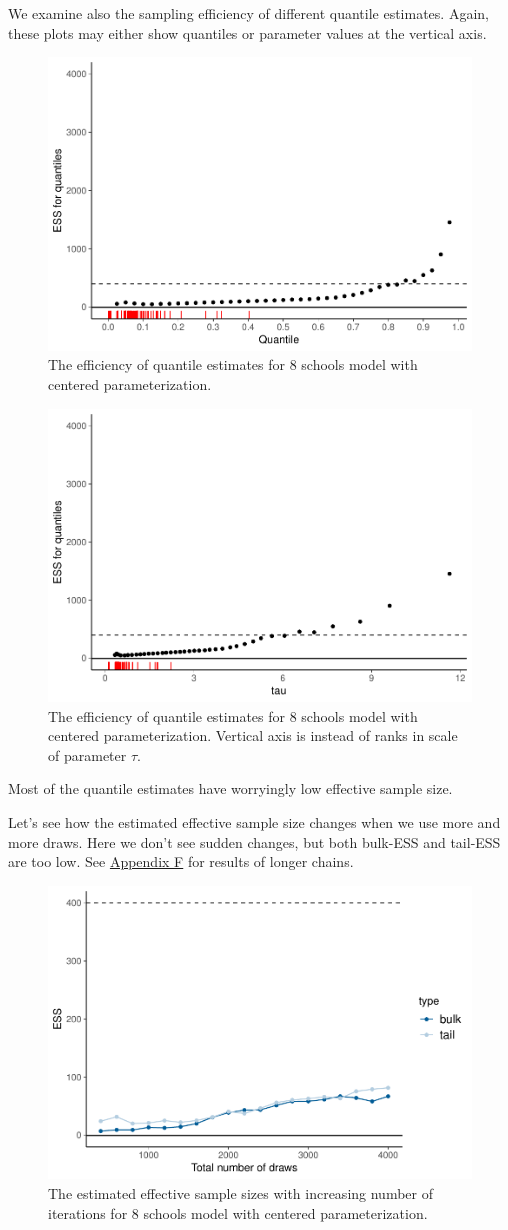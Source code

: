 \documentclass[american,]{article}
\begin{document}
We examine also the sampling efficiency of different quantile estimates.
Again, these plots may either show quantiles or parameter values at the
vertical axis.

\begin{figure}[t]
  \centering
  \includegraphics[width=0.6\linewidth]{graphics/quantile-ess-fit-cp-1.pdf}
  \caption{The efficiency of quantile estimates for 8 schools model with centered parameterization.}
\end{figure}

\begin{figure}[t]
  \centering
  \includegraphics[width=0.6\linewidth]{graphics/quantile-ess-fit-cp-norank-1.pdf}
  \caption{The efficiency of quantile estimates for 8 schools model with centered parameterization. Vertical axis is instead of ranks in scale of parameter $\tau$.}
\end{figure}

Most of the quantile estimates have worryingly low effective sample
size.

Let's see how the estimated effective sample size changes when we use
more and more draws. Here we don't see sudden changes, but both bulk-ESS
and tail-ESS are too low. See \protect\hyperlink{AppendixF}{Appendix F}
for results of longer chains.

\begin{figure}[t]
  \centering
  \includegraphics[width=0.6\linewidth]{graphics/change-ess-fit-cp-1.pdf}
  \caption{The estimated effective sample sizes with increasing number of iterations for 8 schools model with centered parameterization.}
\end{figure}
\end{document}
